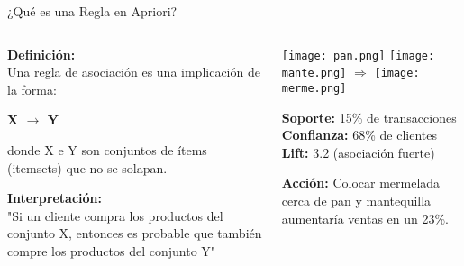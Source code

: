 \documentclass{beamer}
\begin{document}
\begin{frame}{¿Qué es una Regla en Apriori?}
    \begin{columns}[T]
        \begin{column}{0.5\textwidth}
            \textbf{Definición:}\\
            Una regla de asociación es una implicación de la forma:
            \begin{center}
                \colorbox{apriori-blue!90}{\textbf{X $\rightarrow$ Y}}
            \end{center}
            donde X e Y son conjuntos de ítems (itemsets) que no se solapan.
            
            \vspace{0.3cm}
            \textbf{Interpretación:}\\
            "Si un cliente compra los productos del conjunto X, entonces es probable que también compre los productos del conjunto Y"
        \end{column}
        
        \begin{column}{0.5\textwidth}
            \begin{tcolorbox}[
                colback=apriori-orange!10,
                colframe=apriori-orange,
                title=\textbf{Ejemplo Real},
                fonttitle=\bfseries
            ]
                \centering
                \texttt{[image: pan.png]} \texttt{[image: mante.png]}
                $\Rightarrow$
                \texttt{[image: merme.png]}
                
                \vspace{0.2cm}
                \small
                \textbf{Soporte:} 15\% de transacciones\\
                \textbf{Confianza:} 68\% de clientes\\
                \textbf{Lift:} 3.2 (asociación fuerte)
            \end{tcolorbox}
            
            \small
            \textbf{Acción:} Colocar mermelada cerca de pan y mantequilla aumentaría ventas en un 23\%.
        \end{column}
    \end{columns}
\end{frame}
\end{document}
